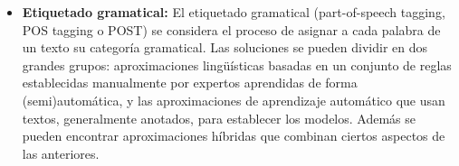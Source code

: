 \documentclass[spanish,12pt, a4paper,twoside]{paper}
\begin{document}
\begin{itemize}
	\item \textbf{Etiquetado gramatical:} El etiquetado gramatical (part-of-speech tagging, POS tagging o POST) se considera el proceso de asignar a cada palabra de un texto su categoría gramatical. Las soluciones se pueden dividir en dos grandes grupos: aproximaciones lingüísticas basadas en un conjunto de reglas establecidas manualmente por expertos aprendidas de forma (semi)automática, y las aproximaciones de aprendizaje automático que usan textos, generalmente anotados, para establecer los modelos. Además se pueden encontrar aproximaciones híbridas que combinan ciertos aspectos de las anteriores.

\end{itemize}



\end{document}
